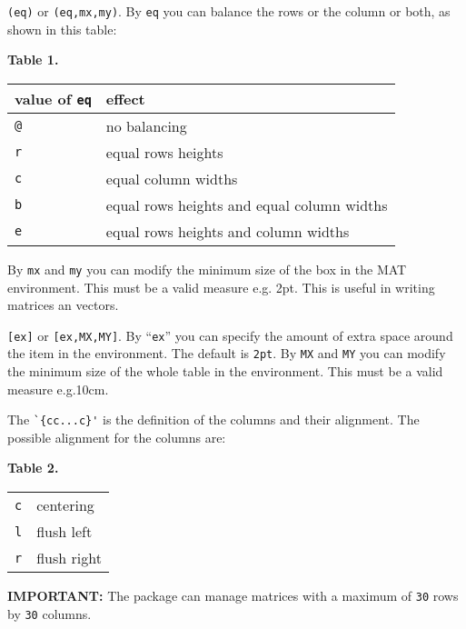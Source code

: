 \documentclass[a4paper]{article}
\begin{document}
\begin{dotlist}
  \item 
  \verb+(eq)+ or \verb+(eq,mx,my)+.  By \verb+eq+ you can balance
  the rows or the column or both, as shown in this table:
  \begin{center}
    \textbf{Table 1.} \\[1em]
    \begin{tabular}{|l|l|}
      \hline
      value of \verb|eq| & effect \\
      \hline
      \verb+@+ & no balancing \\
      \verb+r+ & equal rows heights \\
      \verb+c+ & equal column widths  \\
      \verb+b+ & equal rows heights and equal column widths \\
      \verb+e+ & equal rows heights and column widths \\
      \hline
    \end{tabular}
  \end{center}
  By \verb+mx+ and \verb+my+ you can modify the minimum size of the
  box in the MAT environment.  This must be a valid measure e.g.
  2pt.  This is useful in writing matrices an vectors.
  \item
  \verb+[ex]+ or \verb+[ex,MX,MY]+.  By ``\verb+ex+'' you can
  specify the amount of extra space around the item in the
   environment.  The default is \verb+2pt+.  By
  \verb+MX+ and \verb+MY+ you can modify the minimum size of the
  whole table in the  environment.  This must be a
  valid measure e.g.10cm.
  \item 
  The \verb+`{cc...c}'+ is the definition of the columns and their
  alignment.  The possible alignment for the columns are:
  \begin{center}
    \textbf{Table 2.} \\[1em]
    \begin{tabular}{|l|l|}
      \hline
      \verb+c+ & centering \\
      \verb+l+ & flush left \\
      \verb+r+ & flush right \\
      \hline
    \end{tabular}
  \end{center}
\end{dotlist}
%
\textbf{IMPORTANT:} The package can manage matrices with a maximum 
of \verb|30| rows by \verb|30| columns.
\end{document}
